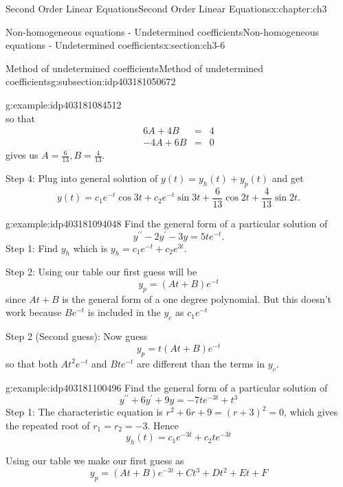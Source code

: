 \documentclass[oneside,10pt,]{book}
\numberwithin{equation}{section}
\numberwithin{equation}{section}
\newcommand{\amp}{&}
\begin{document}
\begin{chapterptx}{Second Order Linear Equations}{}{Second Order Linear Equations}{}{}{x:chapter:ch3}
\begin{sectionptx}{Non-homogeneous equations - Undetermined coefficients}{}{Non-homogeneous equations - Undetermined coefficients}{}{}{x:section:ch3-6}
\begin{subsectionptx}{Method of undetermined coefficients}{}{Method of undetermined coefficients}{}{}{g:subsection:idp403181050672}
\begin{example}{}{g:example:idp403181084512}
\begin{equation*}
\end{equation*}
so that%
\begin{align*}
6A+4B \amp = \amp 4\\
-4A+6B \amp = \amp 0
\end{align*}
gives us \(A=\frac{6}{13},B=\frac{4}{13}\).%
\par
Step 4: Plug into general solution of \(y(t)=y_{h}(t)+y_{p}(t)\) and get%
\begin{equation*}
y(t)=c_{1}e^{-t}\cos3t+c_{2}e^{-t}\sin3t+\frac{6}{13}\cos2t+\frac{4}{13}\sin2t.
\end{equation*}
%
\end{example}
\begin{example}{}{g:example:idp403181094048}%
Find the general form of a particular solution of%
\begin{equation*}
y^{\prime\prime}-2y^{\prime}-3y=5te^{-t}.
\end{equation*}
Step 1: Find \(y_{h}\) which is \(y_{h}=c_{1}e^{-t}+c_{2}e^{3t}\).%
\par
Step 2: Using our table our first guess will be%
\begin{equation*}
y_{p}=\left(At+B\right)e^{-t}
\end{equation*}
since \(At+B\) is the general form of a one degree polynomial. But this doesn't work because \(Be^{-t}\) is included in the \(y_{c}\) as \(c_{1}e^{-t}\)%
\par
Step 2 (Second guess): Now guess%
\begin{equation*}
y_{p}=t\left(At+B\right)e^{-t}
\end{equation*}
so that both \(At^{2}e^{-t}\) and \(Bte^{-t}\) are different than the terms in \(y_{c}\).%
\end{example}
\begin{example}{}{g:example:idp403181100496}%
Find the general form of a particular solution of%
\begin{equation*}
y^{\prime\prime}+6y^{\prime}+9y=-7te^{-3t}+t^{3}
\end{equation*}
Step 1: The characteristic equation is \(r^{2}+6r+9=(r+3)^{2}=0\), which gives the repeated root of \(r_{1}=r_{2}=-3\). Hence%
\begin{equation*}
y_{h}(t)=c_{1}e^{-3t}+c_{2}te^{-3t}
\end{equation*}
%
\par
Using our table we make our first guess as%
\begin{equation*}
y_{p}=\left(At+B\right)e^{-3t}+Ct^{3}+Dt^{2}+Et+F
\end{equation*}

\end{example}
\end{subsectionptx}
\end{sectionptx}
\end{chapterptx}
\end{document}
